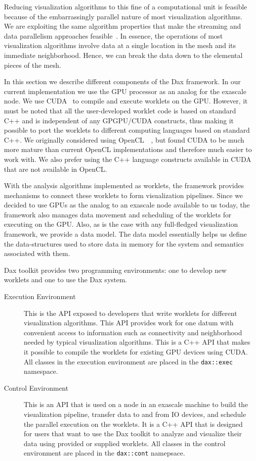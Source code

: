 \documentclass{vgtc}                          %
\newcommand*{\textC}[1]{\texttt{#1}}
\newcommand*{\lcite}[1]{~\cite{#1}}
\begin{document}
Reducing visualization algorithms to this fine of a computational unit is
feasible because of the embarrassingly parallel nature of most
visualization algorithms.  We are exploiting the same algorithm properties
that make the streaming and data parallelism approaches
feasible\lcite{Ahrens00,Ahrens01}.  In essence, the operations of most
visualization algorithms involve data at a single location in the mesh and
its immediate neighborhood.  Hence, we can break the data down to the
elemental pieces of the mesh. 

In this section we describe different components of the Dax framework. In our
current implementation we use the GPU processor as an analog for the exascale
node.  We use CUDA\lcite{CUDA} to compile and execute worklets on the GPU.
However, it must be noted that all the user-developed worklet code is based
on standard C++ and is independent of any GPGPU/CUDA constructs, thus
making it possible to port the worklets to different computing languages
based on standard C++.  We originally considered using
OpenCL~\lcite{OpenCL}, but found CUDA to be much more mature than current
OpenCL implementations and therefore much easier to work with.  We also
prefer using the C++ language constructs available in CUDA that are not
available in OpenCL.

With the analysis algorithms implemented as worklets, the framework provides 
mechanisms to connect these worklets to form visualization pipelines. Since we
decided to use GPUs as the analog to an exascale node available to us today, the
framework also manages data movement and scheduling of the worklets for
executing on the GPU. Also, as is the case with any full-fledged visualization
framework, we provide a data model. The data model essentially helps us
define the data-structures used to store data in memory for the system and
semantics associated with them.

Dax toolkit provides two programming environments: one to develop new worklets and one to use the Dax system.

\begin{description}
\item[Execution Environment] This is the API exposed to developers that
write worklets for different visualization algorithms. This API provides
work for one datum with convenient access to information such as
connectivity and neighborhood needed by typical visualization algorithms. This
is a C++ API that makes it possible to compile the worklets for
existing GPU devices using CUDA.  All classes in the execution environment
are placed in the \textC{dax::exec} namespace.
\item[Control Environment] This is an API that is used on a node in an
exascale machine to build the visualization pipeline, transfer data to and from
IO devices, and schedule the parallel execution on the worklets. It is a C++ API
that is designed for users that want to use the Dax toolkit to analyze and
visualize their data using provided or supplied worklets.  All classes in
the control environment are placed in the \textC{dax::cont} namepsace.
\end{description}
\end{document}
